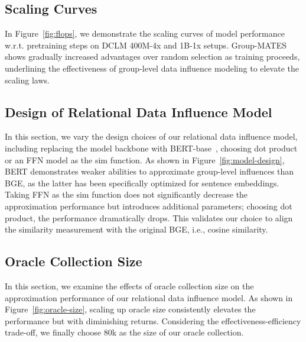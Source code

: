 \subsection{Scaling Curves}

In Figure~\ref{fig:flops}, we demonstrate the scaling curves of model performance w.r.t. pretraining steps on DCLM 400M-4x and 1B-1x setups.
Group-MATES shows gradually increased advantages over random selection as training proceeds, underlining the effectiveness of group-level data influence modeling to elevate the scaling laws. 


\subsection{Design of Relational Data Influence Model}

In this section, we vary the design choices of our relational data influence model, including replacing the model backbone with BERT-base~\cite{devlin-etal-2019-bert}, choosing dot product or an FFN model as the sim function. As shown in Figure~\ref{fig:model-design}, BERT demonstrates weaker abilities to approximate group-level influences than BGE, as the latter has been specifically optimized for sentence embeddings. Taking FFN as the sim function does not significantly decrease the approximation performance but introduces additional parameters; choosing dot product, the performance dramatically drops. This validates our choice to align the similarity measurement with the original BGE, i.e., cosine similarity.

\subsection{Oracle Collection Size}

In this section, we examine the effects of oracle collection size on the approximation performance of our relational data influence model. As shown in Figure~\ref{fig:oracle-size}, scaling up oracle size consistently elevates the performance but with diminishing returns. Considering the effectiveness-efficiency trade-off, we finally choose 80k as the size of our oracle collection.

